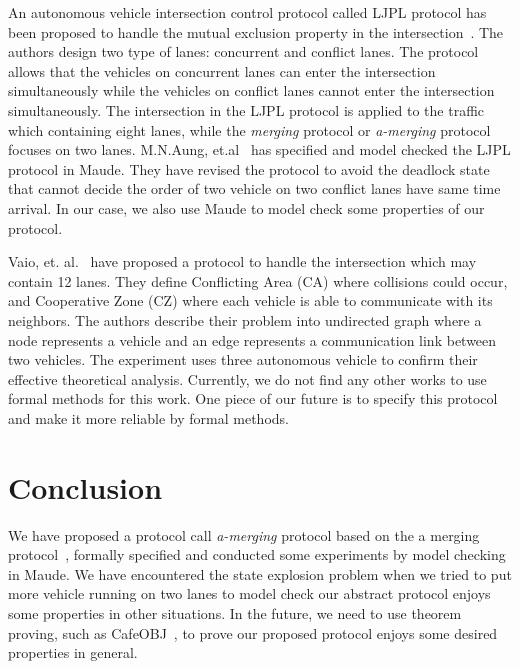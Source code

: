 \documentclass[10pt, conference, compsocconf]{IEEEtran}
\begin{document}
 An autonomous vehicle intersection control protocol called LJPL protocol has been proposed to handle the mutual exclusion property in the intersection~\cite{LimJongBeom2018Aedm}.
 The authors design two type of lanes: concurrent and conflict lanes. 
 The protocol allows that the vehicles on concurrent lanes can enter the intersection simultaneously while the vehicles on conflict lanes cannot enter the intersection simultaneously.
 The intersection in the LJPL protocol is applied to the traffic which containing eight lanes, while the \textit{merging} protocol or \textit{a-merging} protocol focuses on two lanes.
 M.N.Aung, et.al~\cite{DBLP:conf/seke/AungP019} has specified and model checked the LJPL protocol in Maude.
 They have revised the protocol to avoid the deadlock state that cannot decide the order of two vehicle on two conflict lanes have same time arrival.
 In our case, we also use Maude to model check some properties of our protocol.
  
 Vaio, et. al.~\cite{8790807} have proposed a protocol to handle the intersection which may contain 12 lanes.
 They define Conflicting Area (CA) where collisions could occur, and Cooperative Zone (CZ) where each vehicle is able to communicate with its neighbors. 
 The authors describe their problem into undirected graph where a node represents a vehicle and an edge represents a communication link between two vehicles.
 The experiment uses three autonomous vehicle to confirm their effective theoretical analysis.
 Currently, we do not find any other works to use formal methods for this work.
 One piece of our future is to specify this protocol and make it more reliable by formal methods.
 
 








\section{Conclusion}
\label{concl_sect}

We have proposed a protocol call \textit{a-merging} protocol based on the a merging protocol~\cite{10.1145/3055004.3055028}, formally specified and conducted some experiments by model checking in Maude.
We have encountered the state explosion problem when we tried to put more vehicle running on two lanes to model check our abstract protocol enjoys some properties in other situations.
In the future, we need to use theorem proving, such as CafeOBJ~\cite{DiaconescuF98}, to prove our proposed protocol enjoys some desired properties in general.
\end{document}
